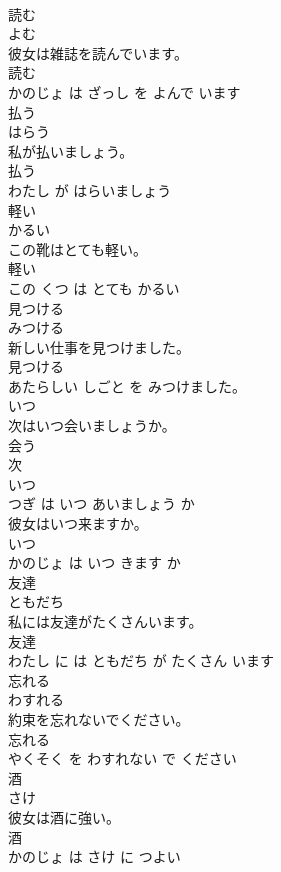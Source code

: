 \documentclass[8pt]{extreport}
\begin{document}
\begin{CJK}{UTF8}{min}
\\	読む	
\\	よむ			
\\	彼女は雑誌を読んでいます。	
\\	読む 
\\	かのじょ は ざっし を よんで います			
\\	払う	
\\	はらう			
\\	私が払いましょう。	
\\	払う 
\\	わたし が はらいましょう			
\\	軽い	
\\	かるい			
\\	この靴はとても軽い。	
\\	軽い 
\\	この くつ は とても かるい			
\\	見つける	
\\	みつける			
\\	新しい仕事を見つけました。	
\\	見つける 
\\	あたらしい しごと を みつけました。			
\\	いつ	
\\	次はいつ会いましょうか。	
\\	会う 
\\	次 
\\	いつ 
\\	つぎ は いつ あいましょう か			
\\	彼女はいつ来ますか。	
\\	いつ 
\\	かのじょ は いつ きます か			
\\	友達	
\\	ともだち			
\\	私には友達がたくさんいます。	
\\	友達 
\\	わたし に は ともだち が たくさん います			
\\	忘れる	
\\	わすれる			
\\	約束を忘れないでください。	
\\	忘れる 
\\	やくそく を わすれない で ください			
\\	酒	
\\	さけ			
\\	彼女は酒に強い。	
\\	酒 
\\	かのじょ は さけ に つよい			

\end{CJK}
\end{document}
